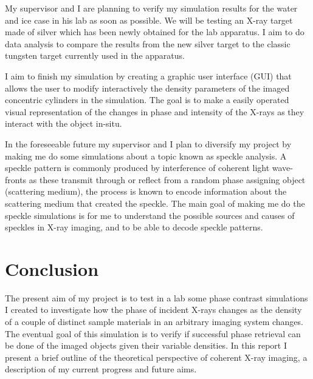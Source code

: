 \documentclass[9pt, a4paper]{article}
\begin{document}
My supervisor and I are planning to verify my simulation results for the water and ice case in his lab as soon as possible. We will be testing an X-ray target made of silver which has been newly obtained for the lab apparatus. I aim to do data analysis to compare the results from the new silver target to the classic tungsten target currently used in the apparatus.

I aim to finish my simulation by creating a graphic user interface (GUI) that allows the user to modify interactively the density parameters of the imaged concentric cylinders in the simulation. The goal is to make a easily operated visual representation of the changes in phase and intensity of the X-rays as they interact with the object in-situ.

In the foreseeable future my supervisor and I plan to diversify my project by making me do some simulations about a topic known as speckle analysis. A speckle pattern is commonly produced by interference of coherent light wave-fronts as these transmit through or reflect from a random phase assigning object (scattering medium), the process is known to encode information about the scattering medium that created the speckle\cite{Specks}. The main goal of making me do the speckle simulations is for me to understand the possible sources and causes of speckles in X-ray imaging, and to be able to decode speckle patterns.

\section{Conclusion}
The present aim of my project is to test in a lab some phase contrast simulations I created to investigate how the phase of incident X-rays changes as the density of a couple of distinct sample materials in an arbitrary imaging system changes. The eventual goal of this simulation is to verify if successful phase retrieval can be done of the imaged objects given their variable densities. In this report I present a brief outline of the theoretical perspective of coherent X-ray imaging, a description of my current progress and future aims.



\end{document}
